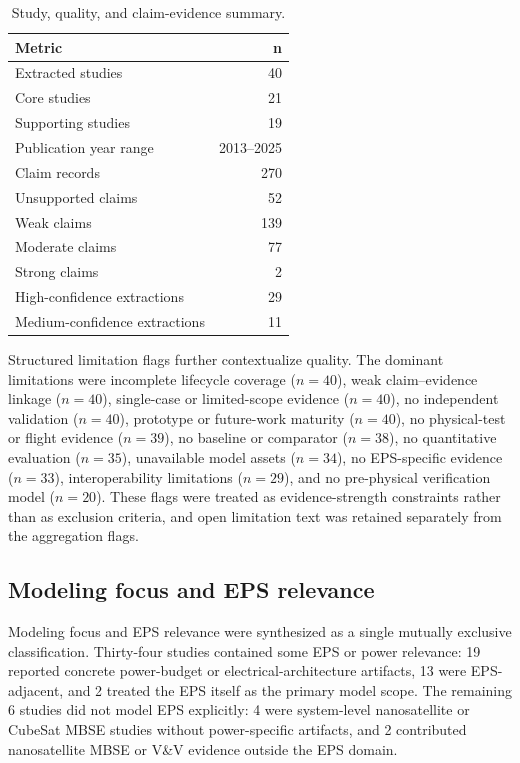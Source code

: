 \begin{table}[htbp]
\centering
\caption{Study, quality, and claim-evidence summary.}
\label{tab:results-study-quality-summary}
\begin{tabular}{lr}
\toprule
Metric & n \\
\midrule
Extracted studies & 40 \\
Core studies & 21 \\
Supporting studies & 19 \\
Publication year range & 2013--2025 \\
Claim records & 270 \\
Unsupported claims & 52 \\
Weak claims & 139 \\
Moderate claims & 77 \\
Strong claims & 2 \\
High-confidence extractions & 29 \\
Medium-confidence extractions & 11 \\
\bottomrule
\end{tabular}
\end{table}

Structured limitation flags further contextualize quality.  The dominant limitations were incomplete lifecycle coverage ($n=40$), weak claim--evidence linkage ($n=40$), single-case or limited-scope evidence ($n=40$), no independent validation ($n=40$), prototype or future-work maturity ($n=40$), no physical-test or flight evidence ($n=39$), no baseline or comparator ($n=38$), no quantitative evaluation ($n=35$), unavailable model assets ($n=34$), no EPS-specific evidence ($n=33$), interoperability limitations ($n=29$), and no pre-physical verification model ($n=20$).  These flags were treated as evidence-strength constraints rather than as exclusion criteria, and open limitation text was retained separately from the aggregation flags.

\subsection{Modeling focus and EPS relevance}
\label{sec:results-modeling-focus-eps}

Modeling focus and EPS relevance were synthesized as a single mutually exclusive classification.  Thirty-four studies contained some EPS or power relevance: 19 reported concrete power-budget or electrical-architecture artifacts, 13 were EPS-adjacent, and 2 treated the EPS itself as the primary model scope.  The remaining 6 studies did not model EPS explicitly: 4 were system-level nanosatellite or CubeSat MBSE studies without power-specific artifacts, and 2 contributed nanosatellite MBSE or V\&V evidence outside the EPS domain.

